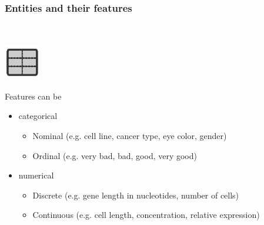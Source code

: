 \documentclass[aspectratio=169]{beamer}
\begin{document}
\begin{frame}
  \frametitle{Entities and their features}    
  \begin{block}{}
    \vspace{0.5cm}
    \ \ \ \
    \begin{minipage}{0.10\textwidth}
      \begin{center}
        \includegraphics[width=1.6cm]{images/publicdomainvectors_ftdissociatecell.pdf}
      \end{center}        
    \end{minipage}
    \hfill
    \begin{minipage}{0.80\textwidth}

      Features can be\\
      \begin{itemize}
        \item categorical
          \begin{itemize}
          \item Nominal (e.g. cell line, cancer type, eye color, gender)
          \item Ordinal (e.g. very bad, bad, good, very good)
          \end{itemize}
        \item numerical
          \begin{itemize}
          \item Discrete (e.g. gene length in nucleotides, number of cells)
          \item Continuous (e.g. cell length, concentration, relative expression) 
          \end{itemize}
      \end{itemize}
      
    \end{minipage}
    \vspace{0.3cm}
  \end{block}
\end{frame}

\end{document}
